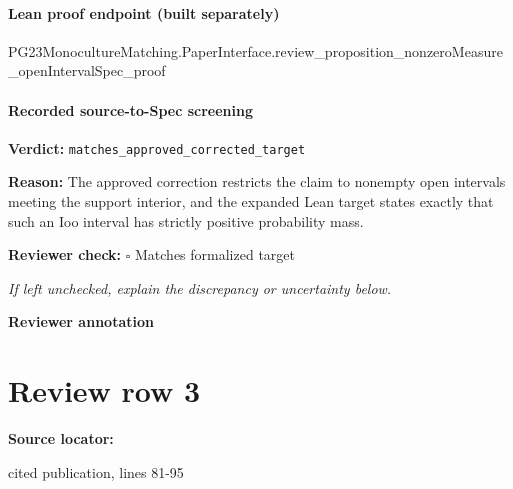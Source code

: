 \documentclass[10pt]{article}
\newcommand{\reviewerbox}{%
  \par\noindent\fbox{\parbox{0.96\linewidth}{\rule{0pt}{0.38in}}}\par
}
\newcommand{\reviewmatch}[1]{%
  \par\noindent\textbf{Reviewer check:} $\square$\; #1\par
  \noindent\emph{If left unchecked, explain the discrepancy or uncertainty below.}\par
}
\begin{document}
\paragraph{Lean proof endpoint (built separately)}\begin{ReviewVerbatim}
PG23MonocultureMatching.PaperInterface.review_proposition_nonzeroMeasure_openIntervalSpec_proof
\end{ReviewVerbatim}

\paragraph{Recorded source-to-Spec screening}
\textbf{Verdict:} \texttt{matches\_approved\_corrected\_target}
\\
{\raggedright
\textbf{Reason:} The approved correction restricts the claim to nonempty open intervals meeting the support interior, and the expanded Lean target states exactly that such an Ioo interval has strictly positive probability mass.\allowbreak{}
\par}
\reviewmatch{Matches formalized target}
\noindent\textbf{Reviewer annotation}\par
\reviewerbox
\clearpage
\hypertarget{source-claim-65a7b194813893fe}{}
\section*{Review row 3}
\textbf{Source locator:} {\footnotesize\raggedright cited publication, lines 81-\allowbreak{}95\par}
\end{document}
